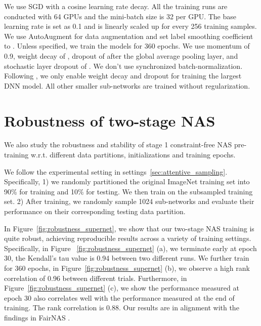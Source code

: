 \documentclass[final]{cvpr}
\theoremstyle{definition}
\begin{document}
We use SGD with a cosine learning rate decay. All the training runs are conducted with 64 GPUs and the mini-batch size is 32 per GPU. 
The base learning rate is set as 0.1 and is linearly scaled up for every 256 training samples.
We use AutoAugment \cite{cubuk2018autoaugment} for data augmentation and set label smoothing coefficient to .
Unless specified, we train the models for 360 epochs.
We use momentum of 0.9, weight decay of , 
dropout of  after the global average pooling layer, and stochastic layer dropout of .  We don't use synchronized batch-normalization. 
Following \cite{yu2020bignas}, we only enable weight decay and dropout 
for training the largest DNN model. All other smaller sub-networks are trained without regularization.  


\section{Robustness of two-stage NAS}
\label{app:sec_robustness}

We also study the robustness and stability of stage 1 constraint-free NAS pre-training w.r.t. different data partitions, initializations and training epochs.

We follow the experimental setting in settings~\ref{sec:attentive_sampling}. 
Specifically, 1) we randomly partitioned the original ImageNet training set into 90\% for training and 10\% for testing. 
We then train on the subsampled training set. 
2) After training, we randomly sample 1024 sub-networks and evaluate their performance on their corresponding testing data partition.  

In Figure~\ref{fig:robustness_supernet}, 
we show that our two-stage NAS training is quite robust, achieving reproducible results across a variety of training settings. Specifically, 
in Figure ~\ref{fig:robustness_supernet} (a), we terminate early at epoch 30, the Kendall's tau value is 0.94 between two different runs. 
We further train for 360 epochs, in Figure~\ref{fig:robustness_supernet} (b), we observe a high rank correlation of 0.96 between different trials. 
Furthermore, in Figure~\ref{fig:robustness_supernet} (c), we show the performance measured at epoch 30 also correlates well with the performance measured at the end of training. The rank correlation is 0.88. 
Our results are in alignment with the findings in FairNAS \cite{chu2019fairnas}.
\end{document}
